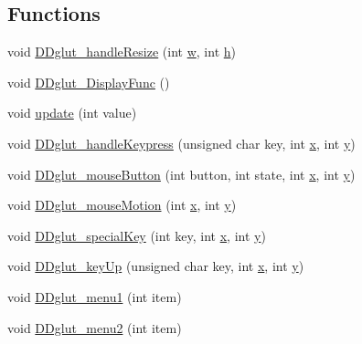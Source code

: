 \subsection*{Functions}
\begin{DoxyCompactItemize}
\item 
void \hyperlink{namespacemodel_a31b9e93ef06b922708948c1734c51d73}{D\+Dglut\+\_\+handle\+Resize} (int \hyperlink{plot_cells_8m_aad57484016654da87125db86f4227ea3}{w}, int \hyperlink{_adams_bashforth_8m_aeddc3ffe9fe529b73ed9521611f731b6}{h})
\item 
void \hyperlink{namespacemodel_a7765b7fff4351e872625423a8c06083e}{D\+Dglut\+\_\+\+Display\+Func} ()
\item 
void \hyperlink{namespacemodel_a4cd97eb3f1505219978825722cb91def}{update} (int value)
\item 
void \hyperlink{namespacemodel_a9cc0c9c743da6c0b558b1cd7896110a5}{D\+Dglut\+\_\+handle\+Keypress} (unsigned char key, int \hyperlink{generate_s_t_lcyl_8m_a9336ebf25087d91c818ee6e9ec29f8c1}{x}, int \hyperlink{generate_s_t_lcyl_8m_a2fb1c5cf58867b5bbc9a1b145a86f3a0}{y})
\item 
void \hyperlink{namespacemodel_a93bbc1e96a0816028b3acdca190d37cc}{D\+Dglut\+\_\+mouse\+Button} (int button, int state, int \hyperlink{generate_s_t_lcyl_8m_a9336ebf25087d91c818ee6e9ec29f8c1}{x}, int \hyperlink{generate_s_t_lcyl_8m_a2fb1c5cf58867b5bbc9a1b145a86f3a0}{y})
\item 
void \hyperlink{namespacemodel_a9401db3d6eb421ecda58705619de68ca}{D\+Dglut\+\_\+mouse\+Motion} (int \hyperlink{generate_s_t_lcyl_8m_a9336ebf25087d91c818ee6e9ec29f8c1}{x}, int \hyperlink{generate_s_t_lcyl_8m_a2fb1c5cf58867b5bbc9a1b145a86f3a0}{y})
\item 
void \hyperlink{namespacemodel_a1e61966ecca3a147321cff6d07cf63d2}{D\+Dglut\+\_\+special\+Key} (int key, int \hyperlink{generate_s_t_lcyl_8m_a9336ebf25087d91c818ee6e9ec29f8c1}{x}, int \hyperlink{generate_s_t_lcyl_8m_a2fb1c5cf58867b5bbc9a1b145a86f3a0}{y})
\item 
void \hyperlink{namespacemodel_a4eaa6b681db94884b05eded662743047}{D\+Dglut\+\_\+key\+Up} (unsigned char key, int \hyperlink{generate_s_t_lcyl_8m_a9336ebf25087d91c818ee6e9ec29f8c1}{x}, int \hyperlink{generate_s_t_lcyl_8m_a2fb1c5cf58867b5bbc9a1b145a86f3a0}{y})
\item 
void \hyperlink{namespacemodel_af795be15a3ed6d6799cfd8234e325669}{D\+Dglut\+\_\+menu1} (int item)
\item 
void \hyperlink{namespacemodel_aff6ed56f3426c89f345f0a598124687a}{D\+Dglut\+\_\+menu2} (int item)

\end{DoxyCompactItemize}
